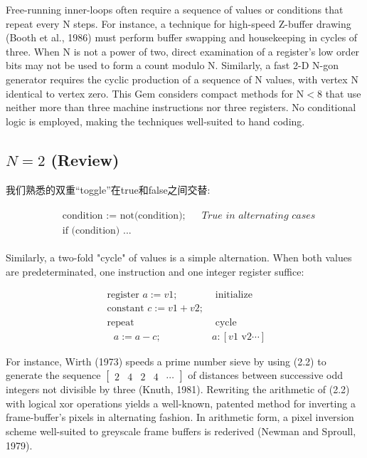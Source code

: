\begin{CJK}{UTF8}{gbsn}
Free-running inner-loops often require a sequence of values or conditions that repeat every $\mathrm{N}$ steps. For instance, a technique for high-speed Z-buffer drawing (Booth et al., 1986) must perform buffer swapping and housekeeping in cycles of three. When $\mathrm{N}$ is not a power of two, direct examination of a register's low order bits may not be used to form a count modulo N. Similarly, a fast 2-D N-gon generator requires the cyclic production of a sequence of $\mathrm{N}$ values, with vertex $\mathrm{N}$ identical to vertex zero. This Gem considers compact methods for $\mathrm{N}<8$ that use neither more than three machine instructions nor three registers. No conditional logic is employed, making the techniques well-suited to hand coding.

\subsection*{$N=2$ (Review)}
我们熟悉的双重“toggle”在true和false之间交替:


\begin{align}
\begin{aligned}
&\text { condition := not(condition); } \quad \textit { True in alternating cases } \\
&\text { if (condition) } . . .
\end{aligned}
\end{align}


Similarly, a two-fold "cycle" of values is a simple alternation. When both values are predeterminated, one instruction and one integer register suffice:

$$
\begin{array}{ll}
\text { register } a:=v 1 ; & \text { initialize } \\
\text { constant } c:=v 1+v 2 ; & \\
\text { repeat } & \text { cycle } \\
\quad a:=a-c ; & a:[v 1 \text { v2} \cdots]
\end{array}
$$

For instance, Wirth (1973) speeds a prime number sieve by using (2.2) to generate the sequence $\left[\begin{array}{lllll}2 & 4 & 2 & 4 & \cdots\end{array}\right]$ of distances between successive odd integers not divisible by three (Knuth, 1981). Rewriting the arithmetic of (2.2) with logical xor operations yields a well-known, patented method for inverting a frame-buffer's pixels in alternating fashion. In arithmetic form, a pixel inversion scheme well-suited to greyscale frame buffers is rederived (Newman and Sproull, 1979).


\end{CJK}
